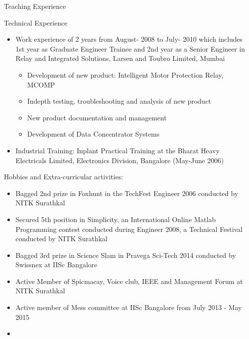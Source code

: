 \documentclass[10pt]{article}
\begin{document}
\begin{cv}
\begin{cvlist}{Teaching Experience}
\end{cvlist}
\begin{cvlist}{Technical Experience}
\item
\begin{itemize}\itemsep=0.25em
	\item Work experience of 2 years from August- 2008 to July- 2010 which includes 1st year as
Graduate Engineer Trainee and 2nd year as a Senior Engineer in Relay and Integrated
Solutions, Larsen and Toubro Limited, Mumbai
\begin{itemize}
 \item
Development of new product: Intelligent Motor Protection Relay, MCOMP
\item
Indepth testing, troubleshooting and analysis of new product
\item
New product documentation and management
\item
Development of Data Concentrator Systems

\end{itemize}




\item
Industrial Training:
Inplant Practical Training at the Bharat Heavy
Electricals Limited, Electronics Division, Bangalore
(May-June 2006)


	
\end{itemize}
\end{cvlist}

\begin{cvlist}{Hobbies and Extra-curricular activities:}
\item
\begin{itemize}\itemsep=0.25em
	\item
Bagged 2nd prize in Foxhunt in the TechFest Engineer 2006
conducted by NITK Surathkal
\item
Secured 5th position in Simplicity, an International
Online Matlab Programming contest conducted during
Engineer 2008, a Technical Festival conducted by NITK
Surathkal

\item Bagged 3rd prize in Science Slam in Pravega Sci-Tech 2014 conducted by Swissnex at IISc Bangalore
\item


Active Member of  Spicmacay, Voice club, IEEE and Management Forum
 at NITK Surathkal
 \item Active member of Mess committee at IISc Bangalore from July 2013 - May 2015
\item


\end{itemize}
\end{cvlist}
\end{cv}
\end{document}
